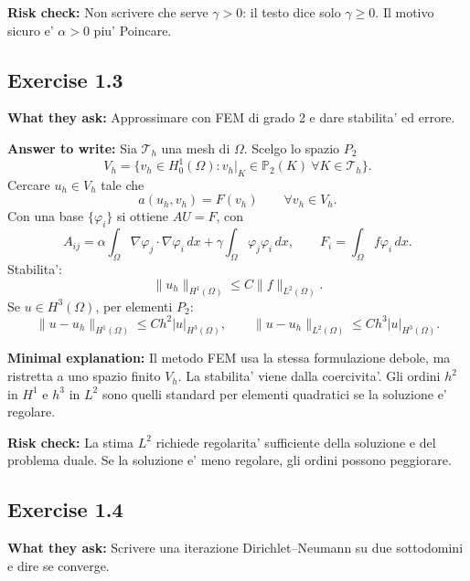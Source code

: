 \documentclass[11pt,a4paper]{article}
\begin{document}
\textbf{Risk check:}
Non scrivere che serve \(\gamma>0\): il testo dice solo \(\gamma\ge0\). Il motivo sicuro e' \(\alpha>0\) piu' Poincare.

\subsection*{Exercise 1.3}
\textbf{What they ask:} Approssimare con FEM di grado 2 e dare stabilita' ed errore.

\textbf{Answer to write:}
Sia \(\mathcal T_h\) una mesh di \(\Omega\). Scelgo lo spazio \(P_2\)
\[
V_h=\{v_h\in H^1_0(\Omega): v_h|_K\in\mathbb P_2(K)\ \forall K\in\mathcal T_h\}.
\]
Cercare \(u_h\in V_h\) tale che
\[
a(u_h,v_h)=F(v_h)\qquad \forall v_h\in V_h.
\]
Con una base \(\{\varphi_i\}\) si ottiene \(AU=F\), con
\[
A_{ij}=\alpha\int_\Omega \nabla\varphi_j\cdot\nabla\varphi_i\,dx
+\gamma\int_\Omega \varphi_j\varphi_i\,dx,
\qquad
F_i=\int_\Omega f\varphi_i\,dx.
\]
Stabilita':
\[
\|u_h\|_{H^1(\Omega)}\le C\|f\|_{L^2(\Omega)}.
\]
Se \(u\in H^3(\Omega)\), per elementi \(P_2\):
\[
\|u-u_h\|_{H^1(\Omega)}\le Ch^2|u|_{H^3(\Omega)},\qquad
\|u-u_h\|_{L^2(\Omega)}\le Ch^3|u|_{H^3(\Omega)}.
\]

\textbf{Minimal explanation:}
Il metodo FEM usa la stessa formulazione debole, ma ristretta a uno spazio finito \(V_h\). La stabilita' viene dalla coercivita'. Gli ordini \(h^2\) in \(H^1\) e \(h^3\) in \(L^2\) sono quelli standard per elementi quadratici se la soluzione e' regolare.

\textbf{Risk check:}
La stima \(L^2\) richiede regolarita' sufficiente della soluzione e del problema duale. Se la soluzione e' meno regolare, gli ordini possono peggiorare.

\subsection*{Exercise 1.4}
\textbf{What they ask:} Scrivere una iterazione Dirichlet--Neumann su due sottodomini e dire se converge.
\end{document}
